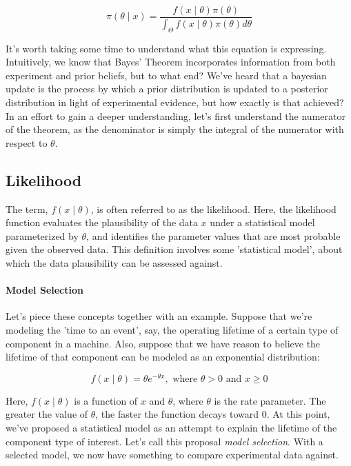 \documentclass[12pt]{article}
\begin{document}
\begin{equation}
\pi(\theta \mid x) = \frac{f(x \mid \theta) \pi(\theta)}{\int_{\Theta} f(x \mid \theta) \pi(\theta) d\theta}
\end{equation}

\noindent It's worth taking some time to understand what this equation is expressing. Intuitively, we know that Bayes' Theorem incorporates information from both experiment and prior beliefs, but to what end? We've heard that a bayesian update is the process by which a prior distribution is updated to a posterior distribution in light of experimental evidence, but how exactly is that achieved? In an effort to gain a deeper understanding, let's first understand the numerator of the theorem, as the denominator is simply the integral of the numerator with respect to $\theta$. \\

\subsection*{Likelihood}
\noindent The term, $f(x\mid\theta)$, is often referred to as the likelihood. Here, the likelihood function evaluates the plausibility of the data $x$ under a statistical model parameterized by $\theta$, and identifies the parameter values that are most probable given the observed data. This definition involves some 'statistical model', about which the data plausibility can be assessed against.

\newpage
\paragraph{Model Selection}
Let's piece these concepts together with an example. Suppose that we're modeling the 'time to an event', say, the operating lifetime of a certain type of component in a machine. Also, suppose that we have reason to believe the lifetime of that component can be modeled as an exponential distribution:

\begin{equation}
f(x \mid \theta) = \theta e^{-\theta x}, \text{ where } \theta > 0 \text{ and } x \ge 0
\end{equation}

\noindent Here, $f(x \mid \theta)$ is a function of $x$ and $\theta$, where $\theta$ is the rate parameter. The greater the value of $\theta$, the faster the function decays toward 0. At this point, we've proposed a statistical model as an attempt to explain the lifetime of the component type of interest. Let's call this proposal \textit{model selection}. With a selected model, we now have something to compare experimental data against. 
\end{document}
